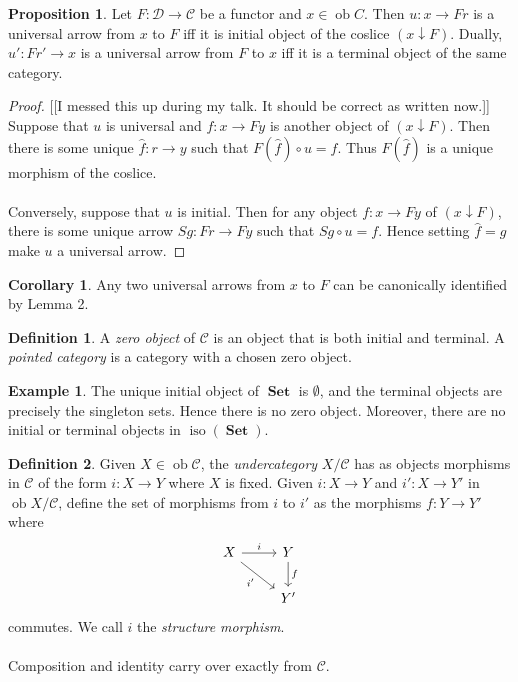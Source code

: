 \documentclass[10pt,letterpaper,cm]{nupset}
\theoremstyle{definition}
\newtheorem*{definition}{Definition}
\newtheorem{exmp}{Example}
\newtheorem{corollary}{Corollary}
\newtheorem{prop}{Proposition}
\newcommand{\1}{\mathbf{1}}
\renewcommand{\c}{\mathscr{C}}
\renewcommand{\d}{\mathscr{D}}
\newcommand{\0}{\vec 0}
\DeclareMathOperator{\ob}{ob}
\DeclareMathOperator{\iso}{iso}
\DeclareMathOperator{\set}{\mathbf{Set}}
\begin{document}
\begin{prop}
Let $F : \d \to \c$ be a functor and $x \in \ob C$. Then $u : x \to Fr$ is a universal arrow from $x$ to $F$ iff it is initial object of the coslice $(x \downarrow F)$. Dually, $u' : Fr' \to x$ is a universal arrow from $F$ to $x$  iff it is a terminal object of the same category.
\end{prop}
\begin{proof}{[[I messed this up during my talk. It should be correct as written now.]]}
Suppose that $u$ is universal and $f: x \to Fy$ is another object of $(x \downarrow F)$. Then there is some unique $\hat{f}: r \to y$ such that $F(\hat{f}) \circ u = f$. Thus $F(\hat{f})$ is a unique morphism of the coslice.
\\ \\Conversely, suppose that $u$ is initial. Then for any object $f: x \to Fy$ of $(x \downarrow F)$, there is some unique arrow $Sg : Fr \to Fy$ such that $Sg \circ u = f$. Hence setting $\hat{f} = g$ make $u$ a universal arrow.
\end{proof}

\begin{corollary}
Any two universal arrows from $x$ to $F$ can be canonically identified by Lemma 2.
\end{corollary}

\begin{definition}
A \textit{zero object} of $\c$ is an object that is both initial and terminal. A \textit{pointed category} is a category with a chosen zero object. 
\end{definition}

\begin{exmp}
The unique initial object of $\set$ is $\emptyset$, and the terminal objects are precisely the singleton sets. Hence there is no zero object. Moreover, there are no initial or terminal objects in $\iso(\set)$.
\end{exmp}

\begin{definition}
Given $X \in \ob \c$, the \textit{undercategory} ${X}/{\c}$ has as objects morphisms in $\c$ of the form $i : X \to Y$ where $X$ is fixed. Given $i: X \to Y$ and  $i' : X \to Y'$ in $\ob {X}/{\c}$, define the set of morphisms from $i$ to $i'$ as the morphisms $f: Y \to Y'$ where
\[ \begin{tikzcd}
X \arrow[r, "i"] \arrow[swap, dr,  " i' "] & Y \arrow[d, "f"] \\%
 & Y'
\end{tikzcd}
\]
commutes. We call $i$ the \textit{structure morphism}.
\\ \\ Composition and identity carry over exactly from $\c$.
\end{definition}
\end{document}
